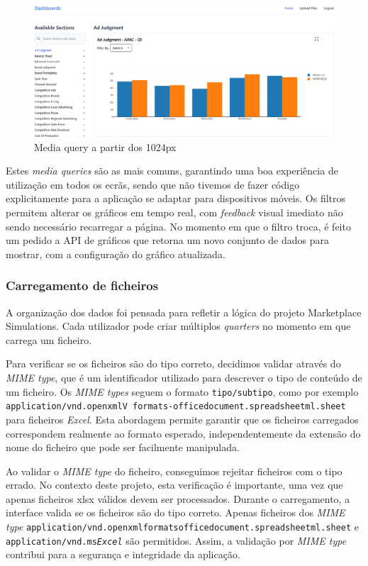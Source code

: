\begin{figure}[htbp]
    \centering
    \includegraphics[max width=\textwidth]{./img/res_1920}
 \caption{Media query a partir dos 1024px}
 \label{fig:res_1920}
\end{figure}

Estes \textit{media queries} são as mais comuns, garantindo uma boa experiência de utilização em todos os ecrãs, sendo que não tivemos de fazer código explicitamente para a aplicação se adaptar para dispositivos móveis. Os filtros permitem alterar os gráficos em tempo real, com \textit{feedback} visual imediato não sendo necessário recarregar a página. No momento em que o filtro troca, é feito um pedido a API de gráficos que retorna um novo conjunto de dados para mostrar, com a configuração do gráfico atualizada.

\subsubsection{Carregamento de ficheiros}

A organização dos dados foi pensada para refletir a lógica do projeto Marketplace Simulations. Cada utilizador pode criar múltiplos \textit{quarters} no momento em que carrega um ficheiro.

Para verificar se os ficheiros são do tipo correto, decidimos validar através do \textit{MIME type}, que é um identificador  utilizado para descrever o tipo de conteúdo de um ficheiro. Os \textit{MIME types} seguem o formato \texttt{tipo/subtipo}, como por exemplo \texttt{application/\allowbreak vnd\allowbreak.open\allowbreak xmlV formats-\allowbreak officedocument.\allowbreak spreadsheetml.\allowbreak sheet} para ficheiros \textit{Excel}. Esta abordagem permite garantir que os ficheiros carregados correspondem realmente ao formato esperado, independentemente da extensão do nome do ficheiro que pode ser facilmente manipulada. 

Ao validar o \textit{MIME type} do ficheiro, conseguimos rejeitar ficheiros com o tipo errado. No contexto deste projeto, esta verificação é importante, uma vez que apenas ficheiros \gls{xlsx} válidos devem ser processados. Durante o carregamento, a interface valida se os ficheiros são do tipo correto. Apenas ficheiros dos \textit{MIME type}  \texttt{application/vnd\allowbreak.openxmlformats\allowbreak officedocument\allowbreak.spreadsheetml\allowbreak.sheet} e \texttt{application/vnd.ms\allowbreak \textit{Excel}} são permitidos.  Assim, a validação por \textit{MIME type} contribui para a segurança e integridade da aplicação.


